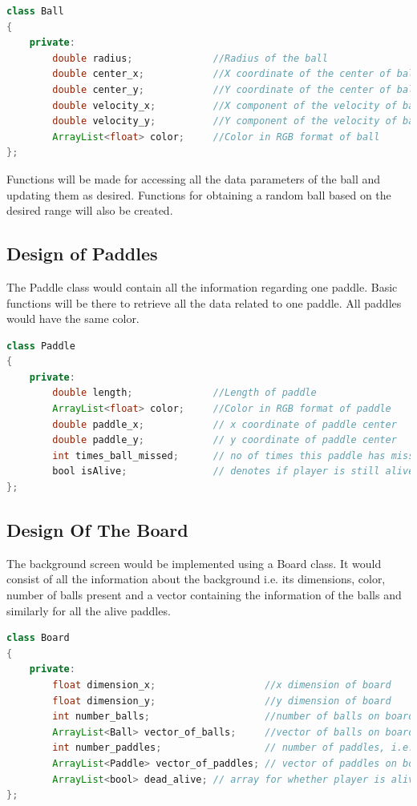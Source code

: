 \documentclass{article}
\begin{document}
\begin{lstlisting}[language=Java, caption={Class Parameters for Ball}]
class Ball
{
	private:
		double radius;              //Radius of the ball
		double center_x;            //X coordinate of the center of ball
		double center_y;            //Y coordinate of the center of ball
		double velocity_x;          //X component of the velocity of ball
		double velocity_y;          //Y component of the velocity of ball
		ArrayList<float> color;   	//Color in RGB format of ball
};

\end{lstlisting}

Functions will be made for accessing all the data parameters of the ball and updating them as desired. Functions for obtaining a random ball based on the desired range will also be created.

\subsection{Design of Paddles} The Paddle class would contain all the information regarding one paddle. Basic functions will be there to retrieve all the data related to one paddle. All paddles would have the same color.

\begin{lstlisting}[language=Java, caption={Class Parameters for Paddle}]
class Paddle
{
	private:
		double length;              //Length of paddle
		ArrayList<float> color;   	//Color in RGB format of paddle
		double paddle_x;			// x coordinate of paddle center
		double paddle_y;			// y coordinate of paddle center
		int times_ball_missed;		// no of times this paddle has missed ball
		bool isAlive;				// denotes if player is still alive
};

\end{lstlisting}

\subsection{Design Of The Board} The background screen would be implemented using a Board class. It would consist of all the information about the background i.e. its dimensions, color, number of balls present and a vector containing the information of the balls and similarly for all the alive paddles.

\begin{lstlisting}[language=Java, caption={Class Parameters for Board}]
class Board
{
	private:
		float dimension_x;                   //x dimension of board
		float dimension_y;                   //y dimension of board
		int number_balls;                    //number of balls on board
		ArrayList<Ball> vector_of_balls;     //vector of balls on board
		int number_paddles;					 // number of paddles, i.e. players
		ArrayList<Paddle> vector_of_paddles; // vector of paddles on board
		ArrayList<bool> dead_alive;	// array for whether player is alive/dead
};

\end{lstlisting}
\end{document}
